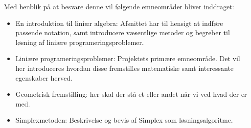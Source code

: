Med henblik på at besvare denne vil følgende emneområder bliver inddraget:
\begin{itemize}
\item En introduktion til liniær algebra: Afsnittet har til hensigt at indføre passende notation, samt introducere væsentlige metoder og begreber til løsning af liniære programeringsproblemer.
\item Liniære programeringsproblemer: Projektets primære emneområde. Det vil her introduceres hvordan disse fremstilles matematiske samt interessante egenskaber herved.
\item Geometrisk fremstilling: her skal der stå et eller andet når vi ved hvad der er med.
\item Simplexmetoden: Beskrivelse og bevis af Simplex som løsningsalgoritme.
\end{itemize}